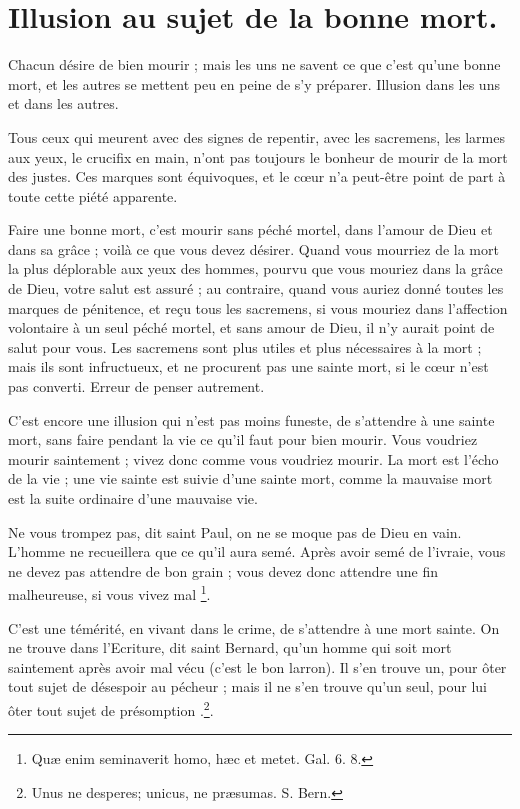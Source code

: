 \documentclass[instructions.tex]{subfiles}
\begin{document}
 
\chapter{Illusion au sujet de la bonne mort.}
 
Chacun désire de bien mourir ; mais les uns ne savent ce que c’est qu’une bonne mort, et les autres se mettent peu en peine de s’y préparer. Illusion dans les uns et dans les autres.
 
\primo Tous ceux qui meurent avec des signes de repentir, avec les sacremens, les larmes aux yeux, le crucifix en main, n’ont pas toujours le bonheur de mourir de la mort des justes. Ces marques sont équivoques, et le cœur n’a peut-être point de part à toute cette piété apparente.
 
Faire une bonne mort, c’est mourir sans péché mortel, dans l’amour de Dieu et dans sa grâce ; voilà ce que vous devez désirer. Quand vous mourriez de la mort la plus déplorable aux yeux des hommes, pourvu que vous mouriez dans la grâce de Dieu, votre salut est assuré ; au contraire, quand vous auriez donné toutes les marques de pénitence, et reçu tous les sacremens, si vous mouriez dans l’affection volontaire à un seul péché mortel, et sans amour de Dieu, il n’y aurait point de salut pour vous. Les sacremens sont plus utiles et plus nécessaires à la mort ; mais ils sont infructueux, et ne procurent pas une sainte mort, si le cœur n’est pas converti. Erreur de penser autrement.
 
\secundo C’est encore une illusion qui n’est pas moins funeste, de s’attendre à une sainte mort, sans faire pendant la vie ce qu’il faut pour bien mourir. Vous voudriez mourir saintement ; vivez donc comme vous voudriez mourir. La mort est l’écho de la vie ; une vie sainte est suivie d’une sainte mort, comme la mauvaise mort est la suite ordinaire d’une mauvaise vie.
 
Ne vous trompez pas, dit saint Paul, on ne se moque pas de Dieu en vain. L’homme ne recueillera que ce qu’il aura semé. Après avoir semé de l’ivraie, vous ne devez pas attendre de bon grain ; vous devez donc attendre une fin malheureuse, si vous vivez mal \footnote{Quæ enim seminaverit homo, hæc et metet. Gal. 6. 8.}.
 
C’est une témérité, en vivant dans le crime, de s’attendre à une mort sainte. On ne trouve dans l’Ecriture, dit saint Bernard, qu’un homme qui soit mort saintement après avoir mal vécu (c’est le bon larron). Il s’en trouve un, pour ôter tout sujet de désespoir au pécheur ; mais il ne s’en trouve qu’un seul, pour lui ôter tout sujet de présomption .\footnote{Unus ne desperes; unicus, ne præsumas. S. Bern.}.
 
\end{document}
